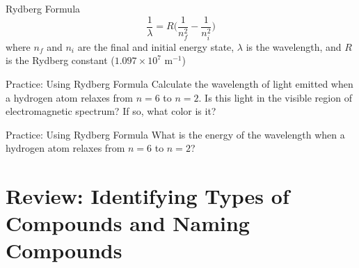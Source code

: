 \documentclass[11pt]{beamer}
\begin{document}
\begin{frame}{Rydberg Formula}
  \begin{equation}
    \frac{1}{\lambda} = R\Bigg(\frac{1}{n_f^2} - \frac{1}{n_i^2}\Bigg)
  \end{equation}
  where $n_f$ and $n_i$ are the final and initial energy state,
  $\lambda$ is the wavelength, and $R$ is the Rydberg constant
  ($1.097\times 10^7$ m$^{-1}$)
\end{frame}

\begin{frame}{Practice: Using Rydberg Formula}
  Calculate the wavelength of light emitted when a hydrogen atom relaxes
  from $n = 6$ to $n = 2$. Is this light in the visible region of
  electromagnetic spectrum? If so, what color is it?
  \vfill
\end{frame}

\begin{frame}{Practice: Using Rydberg Formula}
  What is the energy of the wavelength when a hydrogen atom relaxes
  from $n = 6$ to $n = 2$?
  \vspace{1in}
  \vfill
\end{frame}

\section{Review: Identifying Types of Compounds and Naming Compounds}
\end{document}
